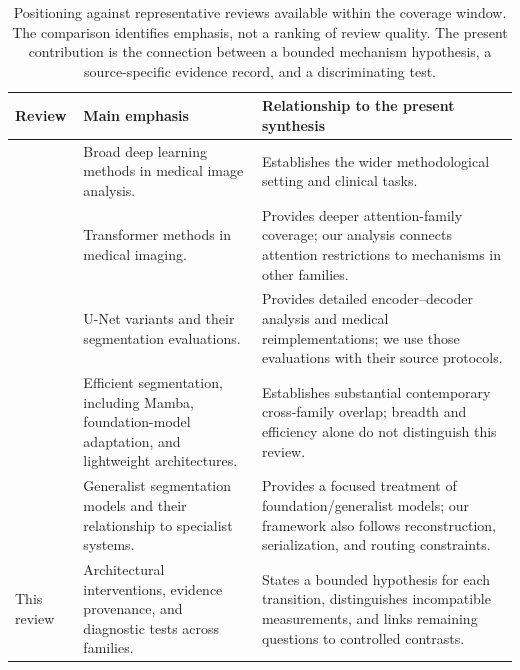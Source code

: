 \documentclass[5p,times,authoryear]{elsarticle}
\begin{document}
\begin{table}[t]
\centering
\caption{Positioning against representative reviews available within the coverage window. The comparison identifies emphasis, not a ranking of review quality. The present contribution is the connection between a bounded mechanism hypothesis, a source-specific evidence record, and a discriminating test.}
\label{tab:survey_comparison}
\small\renewcommand{\arraystretch}{1.15}\setlength{\tabcolsep}{5pt}
\begin{tabularx}{\textwidth}{p{3.25cm}p{4.6cm}X}
\toprule
\textbf{Review} & \textbf{Main emphasis} & \textbf{Relationship to the present synthesis} \\
\midrule
\citep{litjens2017survey} & Broad deep learning methods in medical image analysis. & Establishes the wider methodological setting and clinical tasks. \\
\citep{shamshad2023transformers} & Transformer methods in medical imaging. & Provides deeper attention-family coverage; our analysis connects attention restrictions to mechanisms in other families. \\
\citep{azad2024unet_verified} & U-Net variants and their segmentation evaluations. & Provides detailed encoder--decoder analysis and medical reimplementations; we use those evaluations with their source protocols. \\
\citep{shu2026efficient_verified} & Efficient segmentation, including Mamba, foundation-model adaptation, and lightweight architectures. & Establishes substantial contemporary cross-family overlap; breadth and efficiency alone do not distinguish this review. \\
\citep{moglia2025generalist_verified} & Generalist segmentation models and their relationship to specialist systems. & Provides a focused treatment of foundation/generalist models; our framework also follows reconstruction, serialization, and routing constraints. \\
This review & Architectural interventions, evidence provenance, and diagnostic tests across families. & States a bounded hypothesis for each transition, distinguishes incompatible measurements, and links remaining questions to controlled contrasts. \\
\bottomrule
\end{tabularx}
\end{table}
\end{document}
